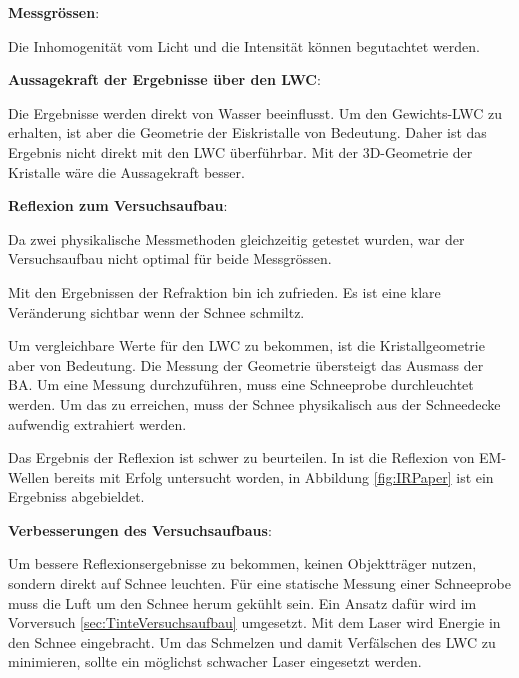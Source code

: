 \textbf{Messgrössen}:

Die Inhomogenität vom Licht und die Intensität können begutachtet werden. 



\textbf{Aussagekraft der Ergebnisse über den LWC}:

Die Ergebnisse werden direkt von Wasser beeinflusst. Um den Gewichts-LWC zu erhalten, ist aber die Geometrie der Eiskristalle von Bedeutung. Daher ist das Ergebnis nicht direkt mit den LWC überführbar. Mit der 3D-Geometrie der Kristalle wäre die Aussagekraft besser.

\textbf{Reflexion zum Versuchsaufbau}:

Da zwei physikalische Messmethoden gleichzeitig getestet wurden, war der Versuchsaufbau nicht optimal für beide Messgrössen.

Mit den Ergebnissen der Refraktion bin ich zufrieden. Es ist eine klare Veränderung sichtbar wenn der Schnee schmiltz.

Um vergleichbare Werte für den LWC zu bekommen, ist die Kristallgeometrie aber von Bedeutung. Die Messung der Geometrie übersteigt das Ausmass der BA. Um eine Messung durchzuführen, muss eine Schneeprobe durchleuchtet werden. Um das zu erreichen, muss der Schnee physikalisch aus der Schneedecke aufwendig extrahiert werden.

Das Ergebnis der Reflexion ist schwer zu beurteilen. In \cite{Donahue.2022} ist die Reflexion von EM-Wellen bereits mit Erfolg untersucht worden, in Abbildung \ref{fig:IRPaper} ist ein Ergebniss abgebieldet.



\textbf{Verbesserungen des Versuchsaufbaus}:

Um bessere Reflexionsergebnisse zu bekommen, keinen Objektträger nutzen, sondern direkt auf Schnee leuchten. Für eine statische Messung einer Schneeprobe muss die Luft um den Schnee herum gekühlt sein. Ein Ansatz dafür wird im Vorversuch \ref{sec:TinteVersuchsaufbau} umgesetzt. Mit dem Laser wird Energie in den Schnee eingebracht. Um das Schmelzen und damit Verfälschen des LWC zu minimieren, sollte ein möglichst schwacher Laser eingesetzt werden.


